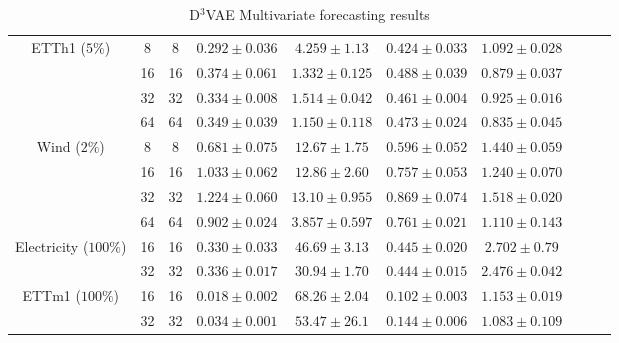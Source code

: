 \begin{table}[ht]
\begin{tabular}{cccccccccc}
        \midrule
        \multirow{4}{*}{ETTh1 ($5\%$)} & 8  & 8  & $0.292 \pm 0.036$ & $4.259 \pm 1.13$  & $0.424 \pm 0.033$ & $1.092 \pm 0.028$ \\
         & 16 & 16 & $0.374 \pm 0.061$ & $1.332 \pm 0.125$ & $0.488 \pm 0.039$ & $0.879 \pm 0.037$ \\
         & 32 & 32 & $0.334 \pm 0.008$ & $1.514 \pm 0.042$ & $0.461 \pm 0.004$ & $0.925 \pm 0.016$ \\
         & 64 & 64 & $0.349 \pm 0.039$ & $1.150 \pm 0.118$ & $0.473 \pm 0.024$ & $0.835 \pm 0.045$ \\
        \midrule
        \multirow{4}{*}{Wind ($2\%$)} & 8  & 8  & $0.681 \pm 0.075$ & $12.67 \pm 1.75$  & $0.596 \pm 0.052$ & $1.440 \pm 0.059$ \\
         & 16 & 16 & $1.033 \pm 0.062$ & $12.86 \pm 2.60$  & $0.757 \pm 0.053$ & $1.240 \pm 0.070$ \\
         & 32 & 32 & $1.224 \pm 0.060$ & $13.10 \pm 0.955$ & $0.869 \pm 0.074$ & $1.518 \pm 0.020$ \\
         & 64 & 64 & $0.902 \pm 0.024$ & $3.857 \pm 0.597$ & $0.761 \pm 0.021$ & $1.110 \pm 0.143$ \\
         \midrule
         \multirow{2}{*}{Electricity ($100\%$)} & 16 & 16 & $0.330 \pm 0.033$ & $46.69 \pm 3.13$ & $0.445 \pm 0.020$ & $2.702 \pm 0.79$ \\
         & 32 & 32 & $0.336 \pm 0.017$ & $30.94 \pm 1.70$ & $0.444 \pm 0.015$ & $2.476 \pm 0.042$ \\
         \midrule
         \multirow{2}{*}{ETTm1 ($100\%$)} & 16 & 16 & $0.018 \pm 0.002$ & $68.26 \pm 2.04$ & $0.102 \pm 0.003$ & $1.153 \pm 0.019$ \\
         & 32 & 32 & $0.034 \pm 0.001$ & $53.47 \pm 26.1$ & $0.144 \pm 0.006$ & $1.083 \pm 0.109$ \\
        \bottomrule
    \end{tabular}
    \caption{D$^3$VAE Multivariate forecasting results \cite{li_generative_2022}}
    \label{tab:d3vae-results}
\end{table}

